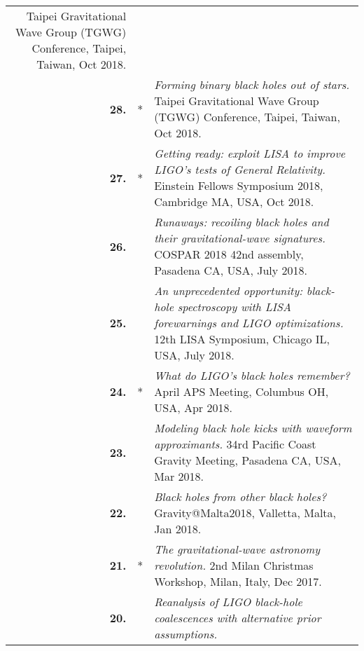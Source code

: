 \documentclass[11pt,letterpaper,sans]{moderncv}   %
\begin{document}
{\begin{longtable}{rp{0.4cm}p{15.8cm}}
\newline{} Taipei Gravitational Wave Group (TGWG) Conference, Taipei, Taiwan, Oct 2018.
\vspace{0.05cm}\\
%
\textbf{28.} & * & \textit{Forming binary black holes out of stars.}
\newline{} Taipei Gravitational Wave Group (TGWG) Conference, Taipei, Taiwan, Oct 2018.
\vspace{0.05cm}\\
%
\textbf{27.} & * & \textit{Getting ready: exploit LISA to improve LIGO's tests of General Relativity.}
\newline{} Einstein Fellows Symposium 2018, Cambridge MA, USA, Oct 2018.
\vspace{0.05cm}\\
%
\textbf{26.} & & \textit{Runaways: recoiling black holes and their gravitational-wave signatures.}
\newline{} COSPAR 2018 42nd assembly, Pasadena CA, USA, July 2018.
\vspace{0.05cm}\\
%
\textbf{25.} & & \textit{An unprecedented opportunity: black-hole spectroscopy with LISA forewarnings and LIGO optimizations.}
\newline{} 12th LISA Symposium, Chicago IL, USA, July 2018.
\vspace{0.05cm}\\
%
\textbf{24.} & * & \textit{What do LIGO's black holes remember?}
\newline{} April APS Meeting, Columbus OH, USA, Apr 2018.
\vspace{0.05cm}\\
%
\textbf{23.} & & \textit{Modeling black hole kicks with waveform approximants.}
\newline{} 34rd Pacific Coast Gravity Meeting, Pasadena CA, USA, Mar 2018.
\vspace{0.05cm}\\
%
\textbf{22.} & & \textit{Black holes from other black holes?}
\newline{} Gravity@Malta2018, Valletta, Malta, Jan 2018.
\vspace{0.05cm}\\
%
\textbf{21.} & * & \textit{The gravitational-wave astronomy revolution.}
\newline{} 2nd Milan Christmas Workshop, Milan, Italy, Dec 2017.
\vspace{0.05cm}\\
%
\textbf{20.} &  & \textit{Reanalysis of LIGO black-hole coalescences with alternative prior assumptions.}

\end{longtable}}
\end{document}
